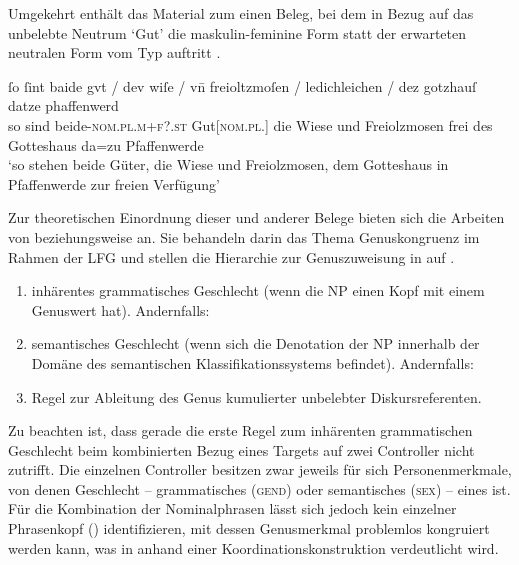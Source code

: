 Umgekehrt enthält das Material zum \CAO{} einen Beleg, bei dem in
Bezug auf das un\-belebte Neutrum  `Gut' die maskulin-feminine
Form  statt der erwarteten neutralen Form vom Typ 
auftritt .

\begin{exe}
\ex\label{ex:1584_gut2}
	\gll ſo ſint baide gvt / dev wiſe / vn̄ freioltzmoſen /
			ledichleichen / dez gotzhauſ datze phaffenwerd \\
		so sind beide-\textsc{nom.pl.m+f?\subI.st} Gut[\textsc{nom.pl.\NeutI}]
			{} die Wiese {} und Freiolzmosen {} frei {} des Gotteshaus da=zu
			Pfaffenwerde \\
	\trans `so stehen beide Güter, die Wiese und Freiolzmosen, dem Gotteshaus
		in Pfaffenwerde zur freien Verfügung'
		\parencites(Nr.~1584, Kl.~Herrenchiemsee, Kr.~Rosenheim, 1292)[727,26--27]{cao2}
\end{exe}

Zur theoretischen Einordnung dieser und anderer Belege bieten sich die Arbeiten
von \citet[171--195]{wechslerzlatic2003} beziehungsweise \citet{wechsler2009}
an. Sie behandeln darin das Thema Genus\-kongruenz im Rahmen der LFG
\autocites(vgl.~){bresnanetal2016} und stellen die
Hierarchie zur Genuszuweisung in  auf
\autocites[][584]{wechsler2009}[195]{wechslerzlatic2003}.

\begin{exe}
\ex\label{ex:gendasshier}
	\begin{enumerate}[noitemsep]
		\item inhärentes grammatisches Geschlecht (wenn die NP einen Kopf
			mit einem Genuswert hat). Andernfalls:
		\item semantisches Geschlecht (wenn sich die Denotation der NP
			innerhalb der Domäne des semantischen Klassifikationssystems
			befindet). Andernfalls:
		\item Regel zur Ableitung des Genus kumulierter unbelebter 
			Diskursreferenten.
	\end{enumerate}
\end{exe}

Zu beachten ist, dass gerade die erste Regel zum inhärenten grammatischen
Geschlecht beim kombinierten Bezug eines Targets auf zwei Controller nicht
zutrifft. Die einzelnen Controller besitzen zwar jeweils für sich
Personenmerkmale, von denen Geschlecht -- grammatisches (\textsc{gend}) oder
semantisches (\textsc{sex}) -- eines ist. Für die Kombination der
Nominalphrasen lässt sich jedoch kein einzelner Phrasenkopf ()
identifizieren, mit dessen Genusmerkmal problemlos kongruiert werden kann, was
in  anhand einer Koordinations\-konstruktion verdeutlicht
wird.

